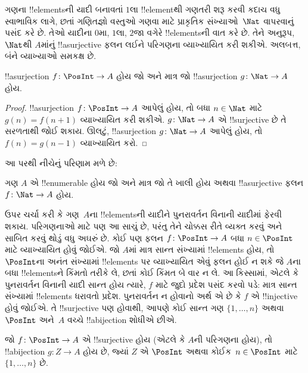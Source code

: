 \documentclass[../../../include/open-logic-section]{subfiles}
\begin{document}
ગણના !!{element}sની યાદી બનાવતાં $1$લા !!{element}થી
ગણતરી શરૂ કરવી કદાચ વધુ સ્વાભાવિક લાગે, છતાં ગણિતજ્ઞો
વસ્તુઓ ગણવા માટે પ્રાકૃતિક સંખ્યાઓ~$\Nat$ વાપરવાનું
પસંદ કરે છે. તેઓ યાદીના $0$મા, $1$લા, $2$જા વગેરે
!!{element}sની વાત કરે છે. તેને અનુરૂપ,
$\Nat$થી $A$માંનું !!a{surjective} ફલન લઈને
પરિગણના વ્યાખ્યાયિત કરી શકીએ. અલબત્ત, બંને વ્યાખ્યાઓ
સમકક્ષ છે.

\begin{prop}
!!a{surjection} $f\colon \PosInt \to A$ હોય
જો અને માત્ર જો !!a{surjection} $g\colon \Nat \to A$ હોય.
\end{prop}

\begin{proof}
!!a{surjection} $f\colon \PosInt \to A$ આપેલું હોય,
તો બધા $n \in \Nat$ માટે $g(n) =
f(n+1)$ વ્યાખ્યાયિત કરી શકીએ.
$g\colon \Nat
\to A$ એ !!{surjective} છે તે સરળતાથી જોઈ શકાય.
ઊલટું, !!a{surjection} $g\colon
\Nat \to A$ આપેલું હોય, તો $f(n) = g(n-1)$ વ્યાખ્યાયિત કરો.
\end{proof}

આ પરથી નીચેનું પરિણામ મળે છે:

\begin{cor}
ગણ $A$ એ !!{enumerable} હોય જો અને માત્ર જો
તે ખાલી હોય અથવા !!a{surjective} ફલન
$f\colon \Nat \to A$ હોય.
\end{cor}

ઉપર ચર્ચા કરી કે ગણ~$A$ના !!{element}sની યાદીને
પુનરાવર્તન વિનાની યાદીમાં ફેરવી શકાય. પરિગણનાઓ માટે
પણ આ સાચું છે, પરંતુ તેને ચોક્કસ રીતે વ્યક્ત કરવું
અને સાબિત કરવું થોડું વધુ અઘરું છે. કોઈ પણ ફલન
$f\colon \PosInt \to A$ બધા $n \in
\PosInt$ માટે વ્યાખ્યાયિત હોવું જોઈએ. જો $A$માં
માત્ર સાન્ત સંખ્યામાં !!{element}s હોય, તો
$\PosInt$ના અનંત સંખ્યામાં !!{element}s પર
વ્યાખ્યાયિત એવું ફલન હોઈ ન શકે જે $A$ના બધા
!!{element}sને કિંમતો તરીકે લે, છતાં કોઈ કિંમત
બે વાર ન લે. આ કિસ્સામાં, એટલે કે પુનરાવર્તન
વિનાની યાદી સાન્ત હોય ત્યારે, $f$ માટે જુદો પ્રદેશ
પસંદ કરવો પડે: માત્ર સાન્ત સંખ્યામાં !!{element}s
ધરાવતો પ્રદેશ. પુનરાવર્તન ન હોવાનો અર્થ એ છે
કે $f$ એ !!{injective} હોવું જોઈએ. તે
!!{surjective} પણ હોવાથી, આપણે કોઈ સાન્ત ગણ
$\{1, \dots, n\}$ અથવા $\PosInt$ અને~$A$
વચ્ચે !!a{bijection} શોધીએ છીએ.

\begin{prop}
જો $f\colon \PosInt \to A$ એ !!{surjective}
હોય (એટલે કે $A$ની પરિગણના હોય), તો
!!a{bijection} $g\colon Z \to A$ હોય છે, જ્યાં
$Z$ એ $\PosInt$ અથવા કોઈક~$n \in \PosInt$
માટે $\{1, \dots, n\}$ છે.
\end{prop}
\end{document}
